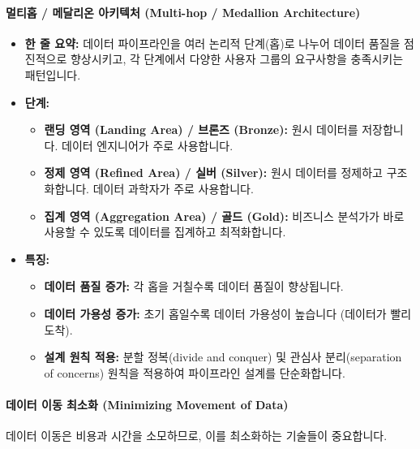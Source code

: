 \documentclass[11pt,a4paper]{article}
\theoremstyle{definition}
\begin{document}
\paragraph{멀티홉 / 메달리온 아키텍처 (Multi-hop / Medallion Architecture)}
\begin{itemize}
    \item \textbf{한 줄 요약:} 데이터 파이프라인을 여러 논리적 단계(홉)로 나누어 데이터 품질을 점진적으로 향상시키고, 각 단계에서 다양한 사용자 그룹의 요구사항을 충족시키는 패턴입니다.
    \item \textbf{단계:}
    \begin{itemize}
        \item \textbf{랜딩 영역 (Landing Area) / 브론즈 (Bronze):} 원시 데이터를 저장합니다. 데이터 엔지니어가 주로 사용합니다.
        \item \textbf{정제 영역 (Refined Area) / 실버 (Silver):} 원시 데이터를 정제하고 구조화합니다. 데이터 과학자가 주로 사용합니다.
        \item \textbf{집계 영역 (Aggregation Area) / 골드 (Gold):} 비즈니스 분석가가 바로 사용할 수 있도록 데이터를 집계하고 최적화합니다.
    \end{itemize}
    \item \textbf{특징:}
    \begin{itemize}
        \item \textbf{데이터 품질 증가:} 각 홉을 거칠수록 데이터 품질이 향상됩니다.
        \item \textbf{데이터 가용성 증가:} 초기 홉일수록 데이터 가용성이 높습니다 (데이터가 빨리 도착).
        \item \textbf{설계 원칙 적용:} 분할 정복(divide and conquer) 및 관심사 분리(separation of concerns) 원칙을 적용하여 파이프라인 설계를 단순화합니다.
    \end{itemize}
\end{itemize}

\paragraph{데이터 이동 최소화 (Minimizing Movement of Data)}
데이터 이동은 비용과 시간을 소모하므로, 이를 최소화하는 기술들이 중요합니다.
\end{document}
